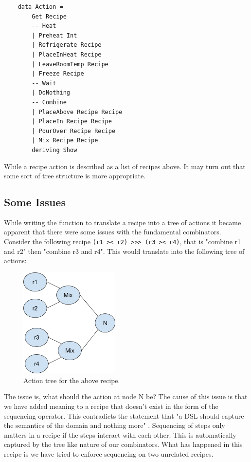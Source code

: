 \documentclass[11pt]{article}
\begin{document}
    \begin{tt}
    \small
    \begin{lstlisting}
    data Action =
        Get Recipe
        -- Heat
        | Preheat Int
        | Refrigerate Recipe
        | PlaceInHeat Recipe
        | LeaveRoomTemp Recipe
        | Freeze Recipe
        -- Wait
        | DoNothing
        -- Combine
        | PlaceAbove Recipe Recipe
        | PlaceIn Recipe Recipe
        | PourOver Recipe Recipe
        | Mix Recipe Recipe
        deriving Show
    \end{lstlisting}
    \end{tt}

    While a recipe action is described as a list of recipes above. It may turn out that some
    sort of tree structure is more appropriate.

    \subsection{Some Issues}

    While writing the function to translate a recipe into a tree of actions it became apparent
    that there were some issues with the fundamental combinators. Consider the following
    recipe \texttt{(r1 >< r2) >>> (r3 >< r4)}, that is "combine r1 and r2" then "combine r3 and r4".
    This would translate into the following tree of actions:

    \begin{figure}[ht]
        \centering
            \includegraphics[width=5cm,keepaspectratio]{issue1.png}
        \caption{Action tree for the above recipe.}
    \end{figure}

    The issue is, what should the action at node N be? The cause of this issue is
    that we have added meaning to a recipe that doesn't exist in the form of the sequencing
    operator. This contradicts the statement that "a DSL should capture the semantics of the
    domain and nothing more" \cite{hudak}. Sequencing of steps only matters in a recipe if
    the steps interact with each other. This is automatically captured by the tree like nature
    of our combinators. What has happened in this recipe is we have tried to enforce sequencing
    on two unrelated recipes. \\
\end{document}
